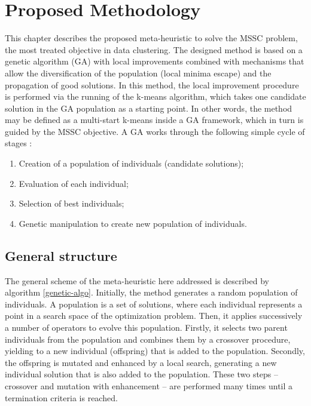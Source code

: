\chapter{Proposed Methodology}
\label{chap:methodology}
This chapter describes the proposed meta-heuristic to solve the MSSC problem, the most treated objective in data clustering. The designed method is based on a genetic algorithm (GA) with local improvements combined with mechanisms that allow the diversification of the population (local minima escape) and the propagation of good solutions. In this method, the local improvement procedure is performed via the running of the k-means algorithm, which takes one candidate solution in the GA population as a starting point. In other words, the method may be defined as a multi-start k-means inside a GA framework, which in turn is guided by the MSSC objective. A GA works through the following simple cycle of stages \cite{Filho1994}:

\begin{enumerate}
	\item Creation of a population of individuals (candidate solutions);

	\item Evaluation of each individual;

	\item Selection of best individuals;

	\item Genetic manipulation to create new population of individuals.
\end{enumerate}


\section{General structure}
The general scheme of the meta-heuristic here addressed is described by algorithm \ref{genetic-algo}. Initially, the method generates a random population of individuals. A population is a set of solutions, where each individual represents a point in a search space of the optimization problem. Then, it applies successively a number of operators to evolve this population. Firstly, it selects two parent individuals from the population and combines them by a crossover procedure, yielding to a new individual (offspring) that is added to the population. Secondly, the offspring is mutated and enhanced by a local search, generating a new individual solution that is also added to the population. These two steps -- crossover and mutation with enhancement -- are performed many times until a termination criteria is reached.

